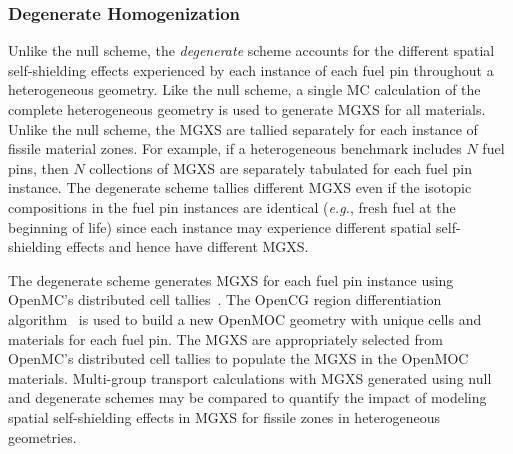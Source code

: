 \subsubsection{Degenerate Homogenization}
\label{subsubsec:homogenize-degenerate}

Unlike the null scheme, the \textit{degenerate} scheme accounts for the different spatial self-shielding effects experienced by each instance of each fuel pin throughout a heterogeneous geometry. Like the null scheme, a single MC calculation of the complete heterogeneous geometry is used to generate MGXS for all materials. Unlike the null scheme, the MGXS are tallied separately for each instance of fissile material zones. For example, if a heterogeneous benchmark includes $N$ fuel pins, then $N$ collections of MGXS are separately tabulated for each fuel pin instance. The degenerate scheme tallies different MGXS even if the isotopic compositions in the fuel pin instances are identical (\textit{e.g.}, fresh fuel at the beginning of life) since each instance may experience different spatial self-shielding effects and hence have different MGXS.

The degenerate scheme generates MGXS for each fuel pin instance using OpenMC's distributed cell tallies~\citep{lax2014distribcell}. The OpenCG region differentiation algorithm~\citep{boyd2015opencg} is used to build a new OpenMOC geometry with unique cells and materials for each fuel pin. The MGXS are appropriately selected from OpenMC's distributed cell tallies to populate the MGXS in the OpenMOC materials. Multi-group transport calculations with MGXS generated using null and degenerate schemes may be compared to quantify the impact of modeling spatial self-shielding effects in MGXS for fissile zones in heterogeneous geometries.
